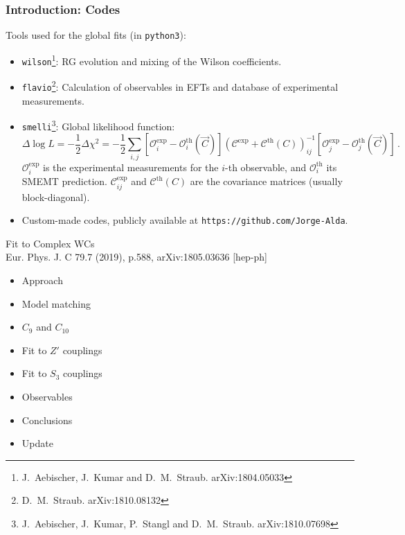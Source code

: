 \documentclass[mathserif, 10pt]{beamer}
\begin{document}
\begin{frame}\frametitle{Introduction: Codes}
    Tools used for the global fits (in \texttt{python3}):
    \begin{itemize}
        \item \texttt{wilson}\footnote[4]{J.~Aebischer, J.~Kumar and D.~M.~Straub. arXiv:1804.05033}: RG evolution and mixing of the Wilson coefficients.
        \item \texttt{flavio}\footnote[5]{D.~M.~Straub. arXiv:1810.08132}: Calculation of observables in EFTs and database of experimental measurements.
        \item \texttt{smelli}\footnote[6]{J.~Aebischer, J.~Kumar, P.~Stangl and D.~M.~Straub. arXiv:1810.07698}: Global likelihood function:
              {\small$$\Delta \log L = -\frac{1}{2}\Delta\chi^2 = -\frac{1}{2}\sum_{i,j} [\mathcal{O}_i^\mathrm{exp} - \mathcal{O}^\mathrm{th}_i(\vec{C})] (\mathcal{C}^\mathrm{exp}+\mathcal{C}^\mathrm{th}(C))^{-1}_{ij} [\mathcal{O}_j^\mathrm{exp} - \mathcal{O}^\mathrm{th}_j(\vec{C})]\,. $$} %
              $\mathcal{O}_i^\mathrm{exp}$ is the experimental measurements for the $i$-th observable, and $\mathcal{O}_i^\mathrm{th}$ its SMEMT prediction. $\mathcal{C}_{ij}^\mathrm{exp}$ and $\mathcal{C}^\mathrm{th}(C)$ are the covariance matrices (usually block-diagonal).%
        \item Custom-made codes, publicly available at \texttt{https://github.com/Jorge-Alda}.
    \end{itemize}
\end{frame}

\begin{frame}[plain] %
    \begin{block}{{\Large Fit to Complex WCs}\\Eur. Phys. J. C 79.7 (2019), p.588, arXiv:1805.03636 [hep-ph]}
        \begin{itemize}
            \item Approach
\item Model matching
            \item $C_9$ and $C_{10}$
            \item Fit to $Z'$ couplings
            \item Fit to $S_3$ couplings
            \item Observables
            \item Conclusions
            \item Update
        \end{itemize}
    \end{block}

\end{frame}
\end{document}
